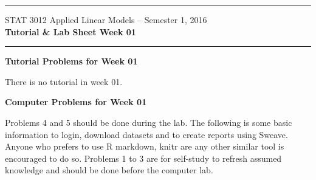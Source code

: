 \documentclass[11pt,a4paper]{article}
\newcommand{\phead}[1]{{\bf{\color{mycol}#1}}}
\begin{document}
\begin{center}
\rule{\textwidth}{1pt}

\vspace{10pt}
{\Large STAT 3012 Applied Linear Models -- Semester 1, 2016\\ \bigskip
 {\bf Tutorial \& Lab Sheet Week 01 }}

\rule{\textwidth}{1pt}
\end{center}


\phead{Tutorial Problems for Week 01}

There is no tutorial in week 01.

\bigskip
\phead{Computer Problems for Week 01}

Problems 4 and 5 should be done during the lab. The following is some basic information to login, download datasets and to create reports using Sweave. Anyone who prefers to use R markdown, knitr are any other similar tool is encouraged to do so. Problems 1 to 3 are for self-study to refresh assumed knowledge and should be done before the computer lab.
\end{document}
